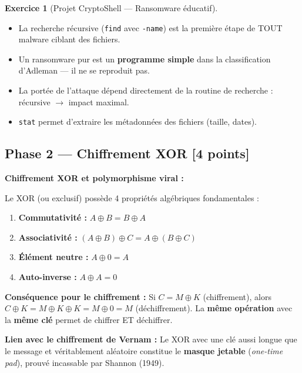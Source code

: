 \documentclass[a4paper,11pt]{article}
\theoremstyle{plain}
\theoremstyle{definition}
\newtheorem{exercice}{Exercice}
\begin{document}
\begin{exercice}[Projet CryptoShell --- Ransomware éducatif]
\begin{correction}
\begin{pointcle}
\begin{itemize}
    \item La recherche récursive (\texttt{find} avec \texttt{-name}) est la première étape de TOUT malware ciblant des fichiers.
    \item Un ransomware pur est un \textbf{programme simple} dans la classification d'Adleman --- il ne se reproduit pas.
    \item La portée de l'attaque dépend directement de la routine de recherche : récursive $\to$ impact maximal.
    \item \texttt{stat} permet d'extraire les métadonnées des fichiers (taille, dates).
\end{itemize}
\end{pointcle}

\end{correction}



\subsection*{Phase 2 --- Chiffrement XOR \hfill \normalsize [4 points]}

\begin{rappel}
\textbf{Chiffrement XOR et polymorphisme viral :}

Le XOR (ou exclusif) possède 4 propriétés algébriques fondamentales :
\begin{enumerate}
    \item \textbf{Commutativité :} $A \oplus B = B \oplus A$
    \item \textbf{Associativité :} $(A \oplus B) \oplus C = A \oplus (B \oplus C)$
    \item \textbf{Élément neutre :} $A \oplus 0 = A$
    \item \textbf{Auto-inverse :} $A \oplus A = 0$
\end{enumerate}

\medskip
\textbf{Conséquence pour le chiffrement :} Si $C = M \oplus K$ (chiffrement), alors $C \oplus K = M \oplus K \oplus K = M \oplus 0 = M$ (déchiffrement). La \textbf{même opération} avec la \textbf{même clé} permet de chiffrer ET déchiffrer.

\medskip
\textbf{Lien avec le chiffrement de Vernam :} Le XOR avec une clé aussi longue que le message et véritablement aléatoire constitue le \textbf{masque jetable} (\textit{one-time pad}), prouvé incassable par Shannon (1949).


\end{rappel}
\end{exercice}
\end{document}
